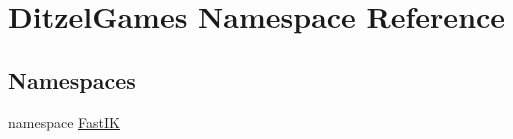 \hypertarget{namespace_ditzel_games}{}\section{Ditzel\+Games Namespace Reference}
\label{namespace_ditzel_games}
\subsection*{Namespaces}
\begin{DoxyCompactItemize}
\item 
namespace \mbox{\hyperlink{namespace_ditzel_games_1_1_fast_i_k}{Fast\+IK}}
\end{DoxyCompactItemize}
